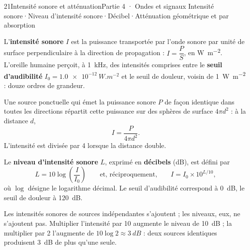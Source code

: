 \begin{ouverture}[son]{21}{Intensité sonore et atténuation}{Partie 4 · Ondes et signaux}
{Intensité sonore\enspace·\enspace Niveau d'intensité sonore\enspace·\enspace Décibel\enspace·\enspace Atténuation géométrique et par absorption}
\end{ouverture}
\essentiel
{}
\begin{definition}
L'\textbf{intensité sonore} $I$ est la puissance transportée par l'onde sonore par unité de surface perpendiculaire
à la direction de propagation : $I=\dfrac{P}{S}$, en \unit{W.m^{-2}}. L'oreille humaine perçoit, à \qty{1}{kHz}, des
intensités comprises entre le \textbf{seuil d'audibilité} $I_0=\qty{1,0e-12}{W.m^{-2}}$ et le seuil de douleur, voisin
de \qty{1}{W.m^{-2}} : douze ordres de grandeur.
\end{definition}
\begin{propriete}
Une source ponctuelle qui émet la puissance sonore $P$ de façon identique dans toutes les directions répartit cette
puissance sur des sphères de surface $4\pi d^2$ : à la distance $d$,
\[I=\frac{P}{4\pi d^2}.\]
L'intensité est divisée par 4 lorsque la distance double.
\end{propriete}
\begin{definition}
Le \textbf{niveau d'intensité sonore} $L$, exprimé en \textbf{décibels} (dB), est défini par
\[L=10\log\left(\frac{I}{I_0}\right)\qquad\text{et, réciproquement,}\qquad I=I_0\times10^{L/10},\]
où $\log$ désigne le logarithme décimal. Le seuil d'audibilité correspond à \qty{0}{dB}, le seuil de douleur à
\qty{120}{dB}.
\end{definition}
\begin{propriete}
Les intensités sonores de sources indépendantes s'ajoutent ; les niveaux, eux, ne s'ajoutent pas. Multiplier
l'intensité par 10 augmente le niveau de \qty{10}{dB} ; la multiplier par 2 l'augmente de $10\log2\approx\qty{3}{dB}$ :
deux sources identiques produisent \qty{3}{dB} de plus qu'une seule.
\end{propriete}
